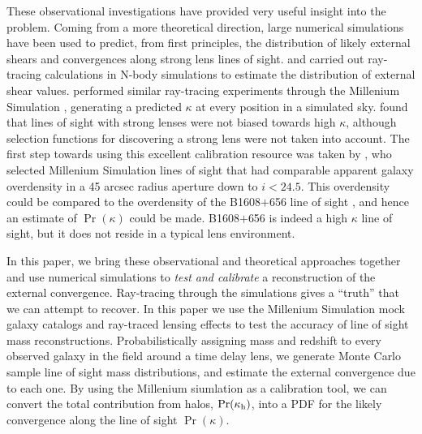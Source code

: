 \documentclass[useAMS,usenatbib]{mn2e}
\begin{document}
These observational investigations have provided very useful insight into the
problem.  Coming from a more theoretical direction, large numerical
simulations have been used to predict, from first principles, the distribution
of likely external shears and convergences along strong lens lines of sight. 
\citet{Holder+Schechter2003} and \citet{Dalal+Watson2004} carried out
ray-tracing calculations in N-body simulations to estimate the  distribution
of external shear values.  \citet{HilbertEtal2009} performed similar ray-tracing
experiments through the Millenium Simulation \citep{SpringelEtal2005},
generating a predicted $\kappa$ at every position in a simulated sky. \citet{HilbertEtal2009}
found that \MS lines of sight with strong lenses were not biased towards high $\kappa$,
although selection functions for discovering a strong lens were not taken into account.
The first step towards using this excellent calibration resource was taken by
\citet{SuyuEtal2010}, who selected Millenium Simulation lines of sight that
 had comparable apparent galaxy
overdensity in a 45 arcsec radius aperture down to $i < 24.5$. This overdensity
could be compared to the overdensity of the B1608$+$656 line of sight
\citep{FassnachtEtal2011}, and hence an estimate of  $\Pr(\kappa)$ could be
made. B1608$+$656 is indeed a high $\kappa$ line of sight, but it does not reside
in a typical lens environment.

In this paper, we bring these observational and theoretical approaches
together and  use numerical simulations to {\it test and calibrate} a
reconstruction of the  external convergence. Ray-tracing through the
simulations gives a ``truth'' that we can attempt to recover.  In this paper
we use the Millenium Simulation mock galaxy catalogs and ray-traced lensing
effects to test the accuracy of line of sight mass reconstructions.
Probabilistically assigning mass and redshift to every observed galaxy in the
field around a time delay lens, we generate Monte Carlo sample line of sight
mass distributions, and estimate the external convergence due to each one.
By using the Millenium siumlation as a calibration tool, we can convert the
total contribution from halos, ${\rm Pr}(\kappa_{\rm h})$, into a PDF for the likely convergence
along the line of sight $\Pr(\kappa)$.
\end{document}
